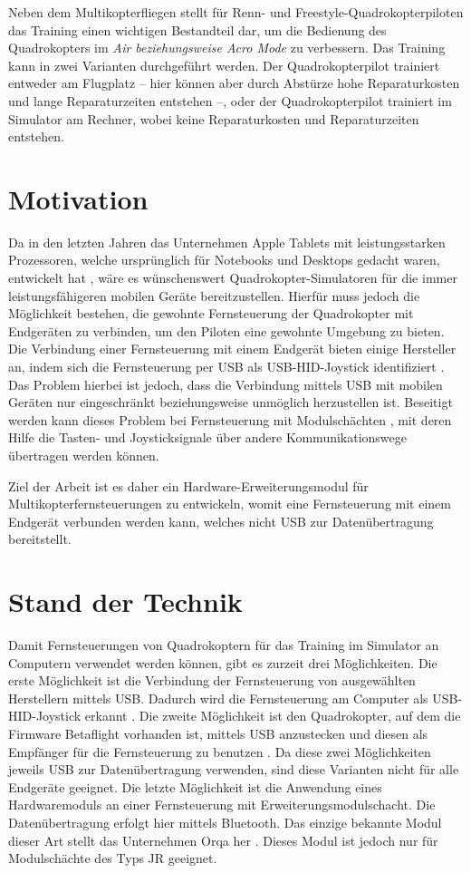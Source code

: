 Neben dem Multikopterfliegen stellt für Renn- und Freestyle-Quadrokopterpiloten das Training einen wichtigen Bestandteil dar, um die Bedienung des Quadrokopters im \textit{Air beziehungsweise Acro Mode} zu verbessern. Das Training kann in zwei Varianten durchgeführt werden. Der Quadrokopterpilot trainiert entweder am Flugplatz -- hier können aber durch Abstürze hohe Reparaturkosten und lange Reparaturzeiten entstehen --, oder der Quadrokopterpilot trainiert im Simulator am Rechner, wobei keine Reparaturkosten und Reparaturzeiten entstehen.

\section{Motivation}

Da in den letzten Jahren das Unternehmen Apple Tablets mit leistungsstarken Prozessoren, welche ursprünglich für Notebooks und Desktops gedacht waren, entwickelt hat \cite{appleM2IPad}, wäre es wünschenswert Quadrokopter-Simulatoren für die immer leistungsfähigeren mobilen Geräte bereitzustellen. Hierfür muss jedoch die Möglichkeit bestehen, die gewohnte Fernsteuerung der Quadrokopter mit Endgeräten zu verbinden, um den Piloten eine gewohnte Umgebung zu bieten. Die Verbindung einer Fernsteuerung mit einem Endgerät bieten einige Hersteller an, indem sich die Fernsteuerung per \acs{USB} als \acs{USB}-\acs{HID}-Joystick identifiziert \cite{opentxJoystick}. Das Problem hierbei ist jedoch, dass die Verbindung mittels \acs{USB} mit mobilen Geräten nur eingeschränkt beziehungsweise unmöglich herzustellen ist. Beseitigt werden kann dieses Problem bei Fernsteuerung mit Modulschächten \cite{opentxModulbay}, mit deren Hilfe  die Tasten- und Joysticksignale über andere Kommunikationswege übertragen werden können.

Ziel der Arbeit ist es daher ein Hardware-Erweiterungsmodul für Multikopterfernsteuerungen zu entwickeln, womit eine Fernsteuerung mit einem Endgerät verbunden werden kann, welches nicht \acs{USB} zur Datenübertragung bereitstellt.

\section{Stand der Technik}

Damit Fernsteuerungen von Quadrokoptern für das Training im Simulator an Computern verwendet werden können, gibt es zurzeit drei Möglichkeiten. Die erste Möglichkeit ist die Verbindung der Fernsteuerung von ausgewählten Herstellern mittels \acs{USB}. Dadurch wird die Fernsteuerung am Computer als \acs{USB}-\acs{HID}-Joystick erkannt \cite{opentxJoystick}. Die zweite Möglichkeit ist den Quadrokopter, auf dem die Firmware Betaflight vorhanden ist, mittels \acs{USB} anzustecken und diesen als Empfänger für die Fernsteuerung zu benutzen \cite{betaflightHID}. Da diese zwei Möglichkeiten jeweils \acs{USB} zur Datenübertragung verwenden, sind diese Varianten nicht für alle Endgeräte geeignet. Die letzte Möglichkeit ist die Anwendung eines Hardwaremoduls an einer Fernsteuerung mit Erweiterungsmodulschacht. Die Datenübertragung erfolgt hier mittels Bluetooth. Das einzige bekannte Modul dieser Art stellt das Unternehmen Orqa her \cite{orqaBluetoothModule}. Dieses Modul ist jedoch nur für Modulschächte des Typs JR geeignet.